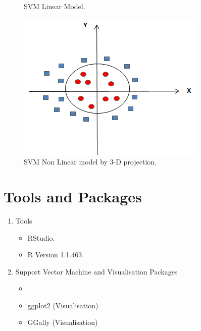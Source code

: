 \documentclass[a4paper,10pt]{article}
\begin{document}
\begin{enumerate}
\begin{figure}[h]
    	\caption{SVM Linear Model.}
    	\label{fig:1}
    \end{figure}
    \begin{figure}[h]
    	\includegraphics[scale=0.30,center]{svmNonLinearData.png}
    	\caption{SVM Non Linear model by 3-D projection.}
    	\label{fig:2}
    \end{figure}
    
\end{enumerate}

\pagebreak
\section{Tools and Packages}
\begin{enumerate}
	\item Tools
	\begin{itemize}
		\item RStudio.
		\item R Version 1.1.463
	\end{itemize}
	\item Support Vector Machine and Visualisation Packages
	\begin{itemize}
		\item 
		\item ggplot2 (Visualisation)
		\item GGally (Visualisation)
	\end{itemize}				
\end{enumerate}
\end{document}
